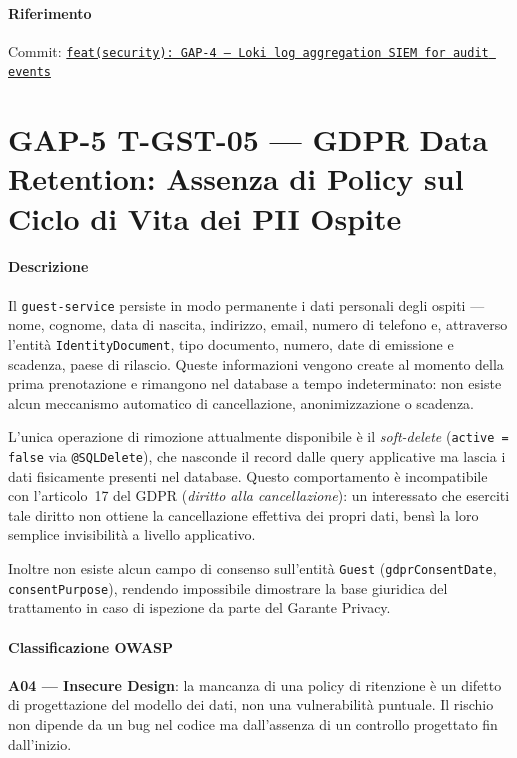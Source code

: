 ﻿\documentclass[a4paper,12pt]{report}
\newcommand{\commitref}[2]{\texttt{\small \href{https://github.com/diegoandruccioli/hotel-pms/commit/#1}{#2}}}
\begin{document}
\paragraph{Riferimento} Commit:
\commitref{fe99e2b}{feat(security): GAP-4 --- Loki log aggregation SIEM for audit events}

\section{GAP-5 \textbar{} T-GST-05 --- GDPR Data Retention: Assenza di Policy sul Ciclo di Vita dei PII Ospite}

\paragraph{Descrizione}
Il \texttt{guest-service} persiste in modo permanente i dati personali degli
ospiti — nome, cognome, data di nascita, indirizzo, email, numero di telefono
e, attraverso l'entità \texttt{IdentityDocument}, tipo documento, numero,
date di emissione e scadenza, paese di rilascio.
Queste informazioni vengono create al momento della prima prenotazione e
rimangono nel database a tempo indeterminato: non esiste alcun meccanismo
automatico di cancellazione, anonimizzazione o scadenza.

L'unica operazione di rimozione attualmente disponibile è il \emph{soft-delete}
(\texttt{active = false} via \texttt{@SQLDelete}), che nasconde il record dalle
query applicative ma lascia i dati fisicamente presenti nel database.
Questo comportamento è incompatibile con l'articolo~17 del GDPR
(\emph{diritto alla cancellazione}): un interessato che eserciti tale diritto
non ottiene la cancellazione effettiva dei propri dati, bensì la loro semplice
invisibilità a livello applicativo.

Inoltre non esiste alcun campo di consenso sull'entità \texttt{Guest}
(\texttt{gdprConsentDate}, \texttt{consentPurpose}), rendendo impossibile
dimostrare la base giuridica del trattamento in caso di ispezione da parte
del Garante Privacy.

\paragraph{Classificazione OWASP}
\textbf{A04 --- Insecure Design}: la mancanza di una policy di ritenzione è
un difetto di progettazione del modello dei dati, non una vulnerabilità
puntuale. Il rischio non dipende da un bug nel codice ma dall'assenza di un
controllo progettato fin dall'inizio.
\end{document}
